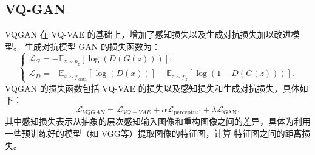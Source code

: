 \subsection{VQ-GAN}

VQGAN 在 VQ-VAE 的基础上，增加了感知损失以及生成对抗损失加以改进模型。
生成对抗模型 GAN 的损失函数为：
$$
\begin{cases}
    \mathcal{L}_G=-\mathbb{E}_{z\sim p_z}[\log (D(G(z)))];\\
    \mathcal{L}_D=-\mathbb{E}_{x\sim p_{\text{data}}}[\log (D(x))]-\mathbb{E}_{z\sim p_z}[\log (1-D(G(z)))].
\end{cases} 
$$
VQGAN 的损失函数包括 VQ-VAE 的损失以及感知损失和生成对抗损失，具体如下：
\begin{equation}
    \mathcal{L}_{VQGAN}=\mathcal{L}_{VQ-VAE}+\alpha\mathcal{L}_{\text{perceptual}}+\lambda\mathcal{L}_{\text{GAN}}.
\end{equation}
其中感知损失表示从抽象的层次感知输入图像和重构图像之间的差异，具体为利用一些预训练好的模型（如 VGG等）提取图像的特征图，计算
特征图之间的距离损失。